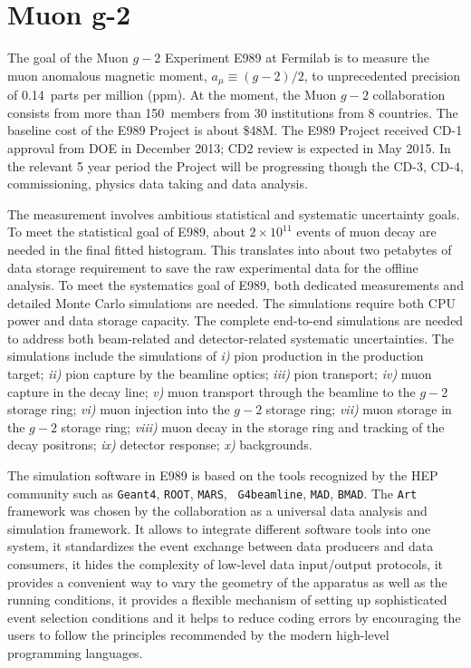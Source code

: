 \documentclass[pdftex,12pt,letter]{article}
\begin{document}
\pagebreak
\section{Muon g-2}

The goal of the Muon $g-2$ Experiment E989 at Fermilab is to measure
the muon anomalous magnetic moment, $a_\mu \equiv (g-2)/2$, to
unprecedented precision of 0.14~parts per million (ppm).
At the moment, the Muon $g-2$ collaboration consists from more than
150~members from 30 institutions from 8 countries. 
The baseline cost of the E989 Project is about \$48M.
The E989 Project received CD-1 approval from DOE in December 2013; CD2
review is expected in May 2015. 
In the relevant 5 year period the Project will be progressing though
the CD-3, CD-4, commissioning, physics data taking and data analysis.  

The measurement involves ambitious statistical and systematic
uncertainty goals. 
To meet the statistical goal of E989, about $2\times 10^{11}$ events
of muon decay are needed in the final fitted histogram. 
This translates into about two petabytes of data storage requirement
to save the raw experimental data for the offline analysis. 
To meet the systematics goal of E989, both dedicated measurements and
detailed Monte Carlo simulations are needed. 
The simulations require both CPU power and data storage capacity.  
The complete end-to-end simulations are needed to address both
beam-related and detector-related systematic uncertainties. 
The simulations include the simulations of
%
{\em i)} pion production in the production target; 
{\em ii)} pion capture by the beamline optics; 
{\em iii)} pion transport; 
{\em iv)} muon capture in the decay line;
{\em v)} muon transport through the beamline to the $g-2$ storage ring; 
{\em vi)} muon injection into the $g-2$ storage ring;
{\em vii)} muon storage in the $g-2$ storage ring; 
{\em viii)} muon decay in the storage ring and tracking of the decay positrons; 
{\em ix)} detector response; 
{\em x)} backgrounds. 

The simulation software in E989 is based on the tools recognized by
the HEP community such as {\tt Geant4}, {\tt ROOT}, {\tt MARS}, {\tt
  G4beamline}, {\tt MAD}, {\tt BMAD}. 
The {\tt Art} framework was chosen by the collaboration as a universal
data analysis and simulation framework.
It allows to integrate different software tools into one system, it
standardizes the event exchange between data producers and data
consumers, it hides the complexity of low-level data input/output
protocols, it provides a convenient way to vary the geometry of the
apparatus as well as the running conditions, it provides a flexible
mechanism of setting up sophisticated event selection conditions and
it helps to reduce coding errors by encouraging the users to follow
the principles recommended by the modern high-level programming
languages.
\end{document}
